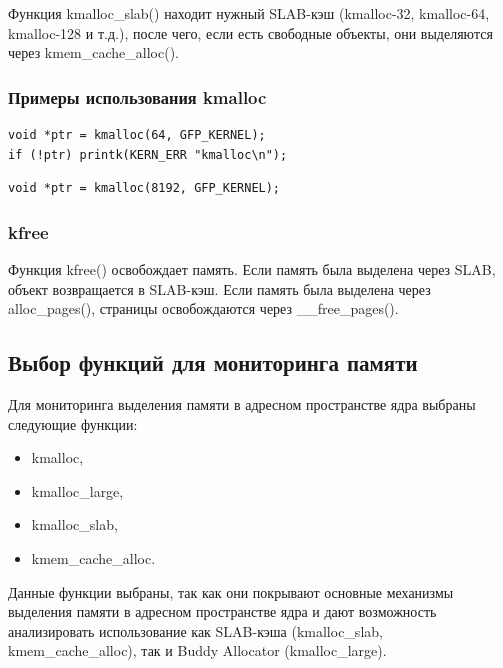 Функция kmalloc\_slab() находит нужный SLAB-кэш (kmalloc-32, kmalloc-64, kmalloc-128 и т.д.), после чего, если есть свободные объекты, они выделяются через kmem\_cache\_alloc().

\subsubsection*{Примеры использования kmalloc}

\begin{lstlisting}[caption={Выделение памяти в SLAB-кэше}]
void *ptr = kmalloc(64, GFP_KERNEL);
if (!ptr) printk(KERN_ERR "kmalloc\n");
\end{lstlisting}

\begin{lstlisting}[caption={Выделение памяти через alloc\_pages}]
void *ptr = kmalloc(8192, GFP_KERNEL);
\end{lstlisting}

\subsubsection*{kfree}

Функция kfree() освобождает память.
Если память была выделена через SLAB, объект возвращается в SLAB-кэш.
Если память была выделена через alloc\_pages(), страницы освобождаются через \_\_free\_pages().


\subsection*{Выбор функций для мониторинга памяти}

Для мониторинга выделения памяти в адресном пространстве ядра выбраны следующие функции:
\begin{itemize}
    \item kmalloc,
    \item kmalloc\_large,
    \item kmalloc\_slab,
    \item kmem\_cache\_alloc.
\end{itemize}

Данные функции выбраны, так как они покрывают основные механизмы выделения памяти в адресном пространстве ядра и дают возможность анализировать использование как SLAB-кэша (kmalloc\_slab, kmem\_cache\_alloc), так и Buddy Allocator (kmalloc\_large).

